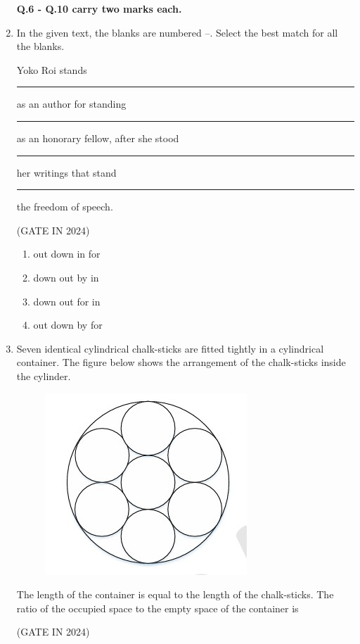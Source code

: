 \documentclass[journal,12pt,onecolumn]{IEEEtran}
\theoremstyle{remark}
\begin{document}
\begin{enumerate}
    \textbf{Q.6 - Q.10 carry two marks each.}

    \item In the given text, the blanks are numbered --. Select the best match for
    all the blanks.
    
    Yoko Roi stands \rule{1.5cm}{0.4pt}  as an author for standing \rule{1.5cm}{0.4pt}  as an honorary
    fellow, after she stood \rule{1.5cm}{0.4pt}  her writings that stand \rule{1.5cm}{0.4pt}  the freedom of
    speech.
    
    \hfill{(GATE IN 2024)}
    \begin{enumerate}
        \item {} out   down   in   for
        \item {} down   out   by   in
        \item {} down   out   for   in
        \item {} out   down   by   for
    \end{enumerate}

    \item Seven identical cylindrical chalk-sticks are fitted tightly in a cylindrical container.
    The figure below shows the arrangement of the chalk-sticks inside the cylinder.
    \begin{figure}[H]
        \centering
        \includegraphics[width=0.4\columnwidth]{figs/p1.jpg}
        \caption*{}
        \label{fig:p1}
    \end{figure}
    The length of the container is equal to the length of the chalk-sticks. The ratio of
    the occupied space to the empty space of the container is
    
    \hfill{(GATE IN 2024)}
    \begin{enumerate}
    \end{enumerate}


\end{enumerate}
\end{document}
